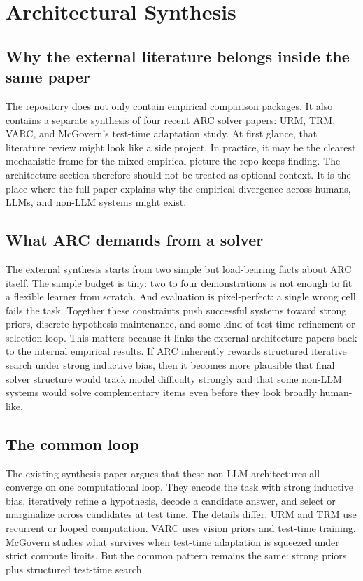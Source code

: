 \section{Architectural Synthesis}

\subsection{Why the external literature belongs inside the same paper}

The repository does not only contain empirical comparison packages. It also contains a separate synthesis of four recent ARC solver papers: URM, TRM, VARC, and McGovern's test-time adaptation study. At first glance, that literature review might look like a side project. In practice, it may be the clearest mechanistic frame for the mixed empirical picture the repo keeps finding. The architecture section therefore should not be treated as optional context. It is the place where the full paper explains why the empirical divergence across humans, LLMs, and non-LLM systems might exist.

\subsection{What ARC demands from a solver}

The external synthesis starts from two simple but load-bearing facts about ARC itself. The sample budget is tiny: two to four demonstrations is not enough to fit a flexible learner from scratch. And evaluation is pixel-perfect: a single wrong cell fails the task. Together these constraints push successful systems toward strong priors, discrete hypothesis maintenance, and some kind of test-time refinement or selection loop. This matters because it links the external architecture papers back to the internal empirical results. If ARC inherently rewards structured iterative search under strong inductive bias, then it becomes more plausible that final solver structure would track model difficulty strongly and that some non-LLM systems would solve complementary items even before they look broadly human-like.

\subsection{The common loop}

The existing synthesis paper argues that these non-LLM architectures all converge on one computational loop. They encode the task with strong inductive bias, iteratively refine a hypothesis, decode a candidate answer, and select or marginalize across candidates at test time. The details differ. URM and TRM use recurrent or looped computation. VARC uses vision priors and test-time training. McGovern studies what survives when test-time adaptation is squeezed under strict compute limits. But the common pattern remains the same: strong priors plus structured test-time search.

